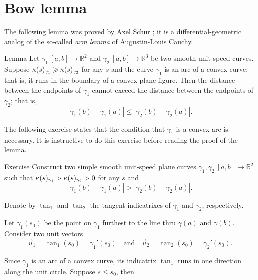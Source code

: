 \section{Bow lemma}

The following lemma was proved by Axel Schur \cite{shur};
it is a differential-geometric analog of the so-called {}\emph{arm lemma} of Augustin-Louis Cauchy.

\begin{thm}{Lemma}\label{lem:bow}
Let $\gamma_1\:[a,b]\to\mathbb{R}^2$ and $\gamma_2\:[a,b] \to\mathbb{R}^3$ be two smooth unit-speed curves.
Suppose $\kappa(s)_{\gamma_1}\geqslant\kappa(s)_{\gamma_2}$ for any $s$ 
and the curve
$\gamma_1$ is an arc of a convex curve; that is, it runs in the boundary of a convex plane figure.
Then the distance between the endpoints of $\gamma_1$ cannot exceed the  distance between the endpoints of $\gamma_2$; that is,
\[|\gamma_1(b)-\gamma_1(a)|\le |\gamma_2(b)-\gamma_2(a)|.\]

\end{thm}

The following exercise states that the condition that $\gamma_1$ is a convex arc is necessary.
It is instructive to do this exercise before reading the proof of the lemma.

{\sloppy 

\begin{thm}{Exercise}\label{ex:anti-bow}
Construct two simple smooth unit-speed plane curves $\gamma_1,\gamma_2\:[a,b]\to\mathbb{R}^2$ such that $\kappa(s)_{\gamma_1}>\kappa(s)_{\gamma_2}>0$ for any $s$ and
\[|\gamma_1(b)-\gamma_1(a)|> |\gamma_2(b)-\gamma_2(a)|.\]
\end{thm}

}

Denote by $\tan_1$ and $\tan_2$ the tangent indicatrixes of $\gamma_1$ and $\gamma_2$, respectively.

Let $\gamma_1(s_0)$ be the point on $\gamma_1$ furthest to the line 
thru $\gamma(a)$ and $\gamma(b)$.
Consider two unit vectors 
\[\vec u_1=\tan_1(s_0)=\gamma_1'(s_0)
\quad\text{and}\quad
\vec u_2=\tan_2(s_0)=\gamma_2'(s_0).\]

Since $\gamma_1$ is an arc of a convex curve, its indicatrix $\tan_1$ runs in one direction along the unit circle.
Suppose $s\le s_0$, then 


